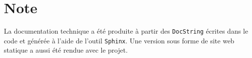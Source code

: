 \section*{Note}

La documentation technique a été produite à partir des \texttt{DocString} écrites dans le code et 
générée à l'aide de l'outil \texttt{Sphinx}. Une version sous forme de site web statique a aussi été 
rendue avec le projet.


